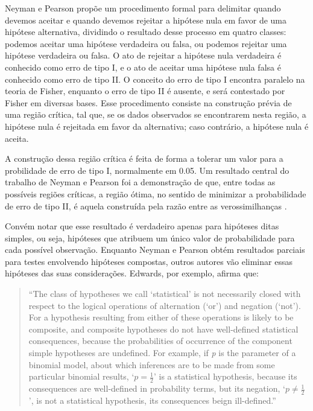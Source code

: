 Neyman e Pearson propõe um procedimento formal para delimitar quando devemos aceitar e quando devemos rejeitar a hipótese
nula em favor de uma hipótese alternativa, dividindo o resultado desse processo em quatro classes: podemos aceitar uma hipótese
verdadeira ou falsa, ou podemos rejeitar uma hipótese verdadeira ou falsa. O ato de rejeitar a hipótese nula verdadeira
é conhecido como erro de tipo I, e o ato de aceitar uma hipótese nula falsa é conhecido como erro de tipo II. O conceito do 
erro de tipo I encontra paralelo na teoria de Fisher, enquanto o erro de tipo II é ausente, e será contestado por Fisher em
diversas bases. Esse procedimento consiste na construção prévia de uma região crítica, tal que, se os dados observados se
encontrarem nesta região, a hipótese nula é rejeitada em favor da alternativa; caso contrário, a hipótese nula é aceita.

A construção dessa região crítica é feita de forma a tolerar um valor para a probilidade de erro de tipo I, normalmente em
0.05. Um resultado central do trabalho de Neyman e Pearson foi a demonstração de que, entre todas as possíveis regiões críticas,
a região ótima, no sentido de minimizar a probabilidade de erro de tipo II, é aquela construída pela razão entre as 
verossimilhanças \citep{Neyman1933}. 

Convém notar que esse resultado é verdadeiro apenas para hipóteses
ditas simples, ou seja, hipóteses que atribuem um único valor de probabilidade para cada possível observação.
Enquanto Neyman e Pearson obtém resultados
parciais para testes envolvendo hipóteses compostas, outros autores vão eliminar essas hipóteses das suas considerações.
Edwards, por exemplo, afirma que:

\begin{quote}
``The class of hypotheses we call `statistical' is not necessarily closed with respect to the logical operations of
alternation (`or') and negation (`not'). For a hypothesis resulting from either of these operations is likely to be composite,
and composite hypotheses do not have well-defined statistical consequences, because the probabilities of occurrence of the
component simple hypotheses are undefined. For example, if {\em p} is the parameter of a binomial model, about which inferences
are to be made from some particular binomial results, `$p = \frac{1}{2}$' is a statistical hypothesis, because its 
consequences are well-defined in probability terms, but its negation, `$p \neq \frac{1}{2}$', is not a statistical hypothesis,
its consequences beign ill-defined.''\citep{Edwards72}
\end{quote}

